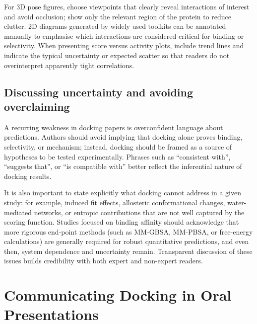\documentclass[12pt]{article}
\begin{document}
For 3D pose figures, choose viewpoints that clearly reveal interactions of interest and avoid occlusion; show only the relevant region of the protein to reduce clutter.\cite{CH11_Berry2015,CH11_Glide2004,CH11_Forli2015} 
2D diagrams generated by widely used toolkits can be annotated manually to emphasise which interactions are considered critical for binding or selectivity.\cite{CH11_Berry2015,CH11_Cheng2012,CH11_zhu2022} 
When presenting score versus activity plots, include trend lines and indicate the typical uncertainty or expected scatter so that readers do not overinterpret apparently tight correlations.\cite{CH11_BindingAffinity2018,CH11_EmpiricalScoring2018,CH11_Warren2006} 

\subsection{Discussing uncertainty and avoiding overclaiming}

A recurring weakness in docking papers is overconfident language about predictions.\cite{CH11_BindingAffinity2018,CH11_IsItReliable2018,CH11_Berry2015} 
Authors should avoid implying that docking alone proves binding, selectivity, or mechanism; instead, docking should be framed as a source of hypotheses to be tested experimentally.\cite{CH11_Forli2015,CH11_Cheng2012,CH11_zhu2022} 
Phrases such as ``consistent with'', ``suggests that'', or ``is compatible with'' better reflect the inferential nature of docking results.\cite{CH11_BindingAffinity2018,CH11_IsItReliable2018,CH11_Kitchen2004} 

It is also important to state explicitly what docking cannot address in a given study: for example, induced fit effects, allosteric conformational changes, water-mediated networks, or entropic contributions that are not well captured by the scoring function.\cite{CH11_Kitchen2004,CH11_EmpiricalScoring2018,CH11_zhu2022} 
Studies focused on binding affinity should acknowledge that more rigorous end-point methods (such as MM-GBSA, MM-PBSA, or free-energy calculations) are generally required for robust quantitative predictions, and even then, system dependence and uncertainty remain.\cite{CH11_EmpiricalScoring2018,CH11_Berry2015,CH11_cosconati2010} 
Transparent discussion of these issues builds credibility with both expert and non-expert readers.\cite{CH11_BindingAffinity2018,CH11_IsItReliable2018,CH11_Forli2015} 

\section{Communicating Docking in Oral Presentations}
\end{document}
